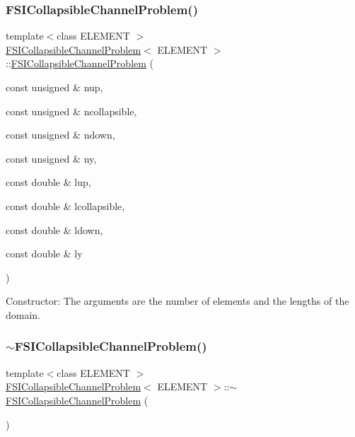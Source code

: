 \subsubsection{\texorpdfstring{F\+S\+I\+Collapsible\+Channel\+Problem()}{FSICollapsibleChannelProblem()}\hspace{0.1cm}{\footnotesize\ttfamily [2/4]}}
{\footnotesize\ttfamily template$<$class E\+L\+E\+M\+E\+NT $>$ \\
\hyperlink{classFSICollapsibleChannelProblem}{F\+S\+I\+Collapsible\+Channel\+Problem}$<$ E\+L\+E\+M\+E\+NT $>$\+::\hyperlink{classFSICollapsibleChannelProblem}{F\+S\+I\+Collapsible\+Channel\+Problem} (\begin{DoxyParamCaption}\item[{const unsigned \&}]{nup,  }\item[{const unsigned \&}]{ncollapsible,  }\item[{const unsigned \&}]{ndown,  }\item[{const unsigned \&}]{ny,  }\item[{const double \&}]{lup,  }\item[{const double \&}]{lcollapsible,  }\item[{const double \&}]{ldown,  }\item[{const double \&}]{ly }\end{DoxyParamCaption})}



Constructor\+: The arguments are the number of elements and the lengths of the domain. 

\mbox{\label{classFSICollapsibleChannelProblem_abe33aaaae15ea3eb10885527a1d1ad9a}} 
\subsubsection{\texorpdfstring{$\sim$\+F\+S\+I\+Collapsible\+Channel\+Problem()}{~FSICollapsibleChannelProblem()}\hspace{0.1cm}{\footnotesize\ttfamily [2/4]}}
{\footnotesize\ttfamily template$<$class E\+L\+E\+M\+E\+NT $>$ \\
\hyperlink{classFSICollapsibleChannelProblem}{F\+S\+I\+Collapsible\+Channel\+Problem}$<$ E\+L\+E\+M\+E\+NT $>$\+::$\sim$\hyperlink{classFSICollapsibleChannelProblem}{F\+S\+I\+Collapsible\+Channel\+Problem} (\begin{DoxyParamCaption}{ }\end{DoxyParamCaption})\hspace{0.3cm}{\ttfamily [inline]}}



